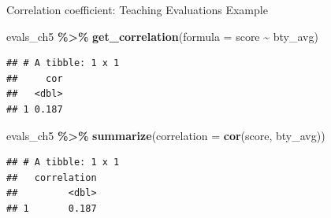 \documentclass[
  ignorenonframetext,
]{beamer}
\newenvironment{Shaded}{\begin{snugshade}}{\end{snugshade}}
\newcommand{\AttributeTok}[1]{\textcolor[rgb]{0.13,0.29,0.53}{#1}}
\newcommand{\FunctionTok}[1]{\textcolor[rgb]{0.13,0.29,0.53}{\textbf{#1}}}
\newcommand{\NormalTok}[1]{#1}
\newcommand{\SpecialCharTok}[1]{\textcolor[rgb]{0.81,0.36,0.00}{\textbf{#1}}}
\begin{document}
\begin{frame}[fragile]{Correlation coefficient: Teaching Evaluations
Example}
\protect\hypertarget{correlation-coefficient-teaching-evaluations-example}{}
\tiny

\begin{Shaded}
\begin{Highlighting}[]
\NormalTok{evals\_ch5 }\SpecialCharTok{\%\textgreater{}\%} 
  \FunctionTok{get\_correlation}\NormalTok{(}\AttributeTok{formula =}\NormalTok{ score }\SpecialCharTok{\textasciitilde{}}\NormalTok{ bty\_avg)}
\end{Highlighting}
\end{Shaded}

\begin{verbatim}
## # A tibble: 1 x 1
##     cor
##   <dbl>
## 1 0.187
\end{verbatim}

\normalsize

\tiny

\begin{Shaded}
\begin{Highlighting}[]
\NormalTok{evals\_ch5 }\SpecialCharTok{\%\textgreater{}\%} 
  \FunctionTok{summarize}\NormalTok{(}\AttributeTok{correlation =} \FunctionTok{cor}\NormalTok{(score, bty\_avg))}
\end{Highlighting}
\end{Shaded}

\begin{verbatim}
## # A tibble: 1 x 1
##   correlation
##         <dbl>
## 1       0.187
\end{verbatim}

\normalsize
\end{frame}
\end{document}
